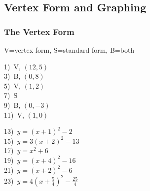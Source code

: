 \documentclass[11pt]{book}
\newcommand{\tmstrong}[1]{\textbf{#1}}
\theoremstyle{definition}  %
\begin{document}
\subsection*{Vertex Form and Graphing}

\subsubsection{The Vertex Form}

V=vertex form, S=standard form, B=both
\begin{multicols}{2}
  1)~V, $(12,5)$\\%
  3)~B, $(0,8)$\\%
  5)~V, $(1,2)$\\%
  7)~S\\%
  9)~B, $(0,-3)$\\%
  11)~V, $(1,0)$%
\end{multicols}



\begin{multicols}{2}
  13)~$y=(x+1)^2-2$\\
  15)~$y=3(x+2)^2-13$\\
  17)~$y=x^2+6$\\
  19)~$y=(x+4)^2-16$\\
  21)~$y=(x+2)^2-6$\\
  23)~$y=4\left(x+\frac{5}{4}\right)^2-\frac{25}{4}$%
\end{multicols}
\end{document}
